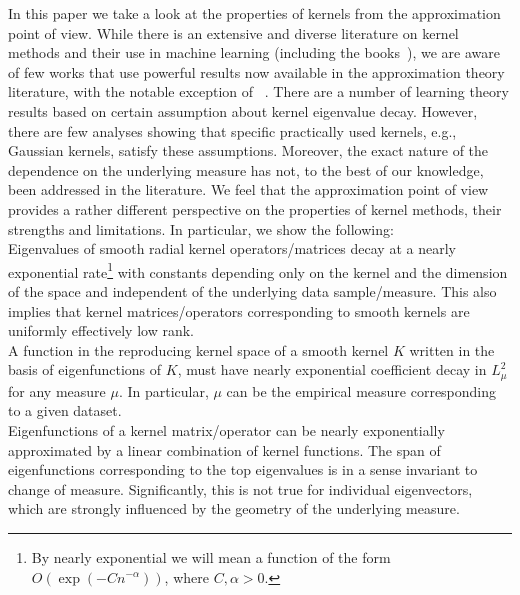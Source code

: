 \documentclass[final,12pt]{colt2018}
\newcommand{\LL}{{L^2_\mu}}
\begin{document}
In this paper we take a look at the properties of kernels from the approximation point of view. While there is  an extensive and diverse literature on  kernel methods  and their use in machine learning (including the books~\cite{scholkopf2001learning, shawe2004kernel, steinwart2008support}), we are aware of few works that use powerful results now available in the approximation theory literature, with the notable exception of ~\cite{rieger2010sampling}. 
There are a number of learning theory results based on certain assumption about kernel eigenvalue decay. However, there are few analyses showing that specific practically used kernels, e.g., Gaussian kernels, satisfy these assumptions. Moreover, the exact nature of the dependence on the underlying measure has not, to the best of our knowledge, been addressed in the literature. 
We feel that the approximation point of  view provides a rather different perspective on the properties of kernel  methods, their strengths and limitations. 
In particular,  we  show the following:\\
 Eigenvalues of smooth radial kernel operators/matrices decay at a nearly exponential rate\footnote{By nearly exponential  we will mean a function of the form $O(\exp(-C n^{-\alpha}))$, where $C,\alpha > 0$. } with constants depending only on the kernel and the dimension of the space and independent of the  underlying data sample/measure. This also implies that  kernel matrices/operators corresponding to smooth kernels are uniformly effectively low rank. \\
 A function in the reproducing kernel space of a smooth kernel $K$ written in the basis of eigenfunctions of $K$, must have nearly exponential coefficient decay in $\LL$ for any measure $\mu$. In particular, $\mu$ can be the empirical measure corresponding to a given dataset. \\
 Eigenfunctions of a kernel matrix/operator can be nearly exponentially approximated 
by a linear combination of  kernel functions. The span of  eigenfunctions
corresponding to the top eigenvalues is in a  sense
invariant to change of measure.  Significantly,  this is not true for individual eigenvectors, which are strongly influenced by the geometry of the underlying measure. \\
\end{document}
